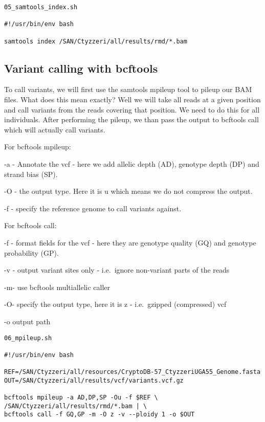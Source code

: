 \documentclass[
]{article}
\begin{document}
\begin{verbatim}
05_samtools_index.sh

#!/usr/bin/env bash

samtools index /SAN/Ctyzzeri/all/results/rmd/*.bam
\end{verbatim}

\hypertarget{variant-calling-with-bcftools}{%
\subsection{Variant calling with
bcftools}\label{variant-calling-with-bcftools}}

To call variants, we will first use the samtools mpileup tool to pileup
our BAM files. What does this mean exactly? Well we will take all reads
at a given position and call variants from the reads covering that
position. We need to do this for all individuals. After performing the
pileup, we than pass the output to bcftools call which will actually
call variants.

For bcftools mpileup:

-a - Annotate the vcf - here we add allelic depth (AD), genotype depth
(DP) and strand bias (SP).

-O - the output type. Here it is u which means we do not compress the
output.

-f - specify the reference genome to call variants against.

For bcftools call:

-f - format fields for the vcf - here they are genotype quality (GQ) and
genotype probability (GP).

-v - output variant sites only - i.e.~ignore non-variant parts of the
reads

-m- use bcftools multiallelic caller

-O- specify the output type, here it is z - i.e.~gzipped (compressed)
vcf

-o output path

\begin{verbatim}
06_mpileup.sh

#!/usr/bin/env bash

REF=/SAN/Ctyzzeri/all/resources/CryptoDB-57_CtyzzeriUGA55_Genome.fasta
OUT=/SAN/Ctyzzeri/all/results/vcf/variants.vcf.gz

bcftools mpileup -a AD,DP,SP -Ou -f $REF \
/SAN/Ctyzzeri/all/results/rmd/*.bam | \
bcftools call -f GQ,GP -m -O z -v --ploidy 1 -o $OUT
\end{verbatim}
\end{document}
